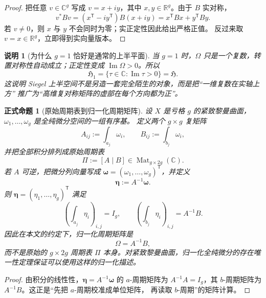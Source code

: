 \documentclass[UTF8,fontset=none,a4paper,11pt]{ctexart}
\theoremstyle{foundation-definition}
\theoremstyle{foundation-theorem}
\theoremstyle{foundation-proposition}
\newtheorem{proposition}[definition]{正式命题}
\theoremstyle{foundation-example}
\theoremstyle{foundation-remark}
\newtheorem{remark}[definition]{说明}
\theoremstyle{foundation-theorem}
\begin{document}
\begin{proof}
把任意 \(v\in\mathbb C^g\) 写成 \(v=x+iy\)，其中 \(x,y\in\mathbb R^g\)。由于 \(B\) 实对称，
\[
v^*Bv=(x^{\mathsf T}-iy^{\mathsf T})B(x+iy)
=x^{\mathsf T}Bx+y^{\mathsf T}By.
\]
若 \(v\neq0\)，则 \(x\) 与 \(y\) 不会同时为零；实正定性因此给出严格正值。
反过来取 \(v=x\in\mathbb R^g\)，立即得到实向量版本。
\end{proof}

\begin{remark}[为什么 \(g=1\) 恰好是通常的上半平面]
当 \(g=1\) 时，\(\Omega\) 只是一个复数，转置对称性自动成立；正定性变成
\(\operatorname{Im}\Omega>0\)。所以
\[
\mathfrak H_1=\{\tau\in\mathbb C:\operatorname{Im}\tau>0\}=\mathfrak H.
\]
这说明 Siegel 上半空间不是另造一套完全陌生的对象，而是把“一维复数在实轴上方”
推广为“高维复对称矩阵的虚部在每个方向都为正”。
\end{remark}

\begin{proposition}[原始周期表到归一化周期矩阵]\label{prop:period-table-normalization}
设 \(X\) 是亏格 \(g\) 的紧致黎曼曲面，\(\omega_1,\ldots,\omega_g\) 是全纯微分空间的一组有序基。
定义两个 \(g\times g\) 复矩阵
\[
A_{ij}:=\int_{a_j}\omega_i,\qquad
B_{ij}:=\int_{b_j}\omega_i,
\]
并把全部积分排列成原始周期表
\[
\Pi:=[A\mid B]\in\operatorname{Mat}_{g\times 2g}(\mathbb C).
\]
若 \(A\) 可逆，把微分列向量写成
\(\boldsymbol\omega=(\omega_1,\ldots,\omega_g)^{\mathsf T}\)，并定义
\[
\boldsymbol\eta:=A^{-1}\boldsymbol\omega.
\]
则 \(\boldsymbol\eta=(\eta_1,\ldots,\eta_g)^{\mathsf T}\) 满足
\[
\left(\int_{a_j}\eta_i\right)_{i,j}=I_g,\qquad
\left(\int_{b_j}\eta_i\right)_{i,j}=A^{-1}B.
\]
因此在本文的约定下，归一化周期矩阵是
\[
\Omega=A^{-1}B,
\]
而不是原始的 \(g\times2g\) 周期表 \(\Pi\) 本身。对紧致黎曼曲面，归一化全纯微分的存在唯一性定理保证可以使用这样的归一化描述。
\end{proposition}

\begin{proof}
由积分的线性性，\(\boldsymbol\eta=A^{-1}\boldsymbol\omega\) 的 \(a\)-周期矩阵为
\(A^{-1}A=I_g\)，其 \(b\)-周期矩阵为 \(A^{-1}B\)。这正是“先把 \(a\)-周期校准成单位矩阵，
再读取 \(b\)-周期”的矩阵计算。
\end{proof}
\end{document}
